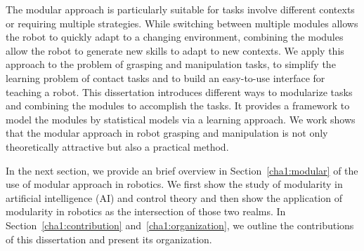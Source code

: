 The modular approach is particularly suitable for tasks involve different contexts or requiring multiple strategies. While switching between multiple modules allows the robot to quickly adapt to a changing environment, combining the modules allow the robot to generate new skills to adapt to new contexts. We apply this approach to the problem of grasping and manipulation tasks, to simplify the learning problem of contact tasks and to build an easy-to-use interface for teaching a robot. This dissertation introduces different ways to modularize tasks and combining the modules to accomplish the tasks. It provides a framework to model the modules by statistical models via a learning approach. We work shows that the modular approach in robot grasping and manipulation is not only theoretically attractive but also a practical method.

In the next section, we provide an brief overview in Section~\ref{cha1:modular} of the use of modular approach in robotics. We first show the study of modularity in artificial intelligence (AI) and control theory and then show the application of modularity in robotics as the intersection of those two realms. In Section~\ref{cha1:contribution} and~\ref{cha1:organization}, we outline the contributions of this dissertation and present its organization.





